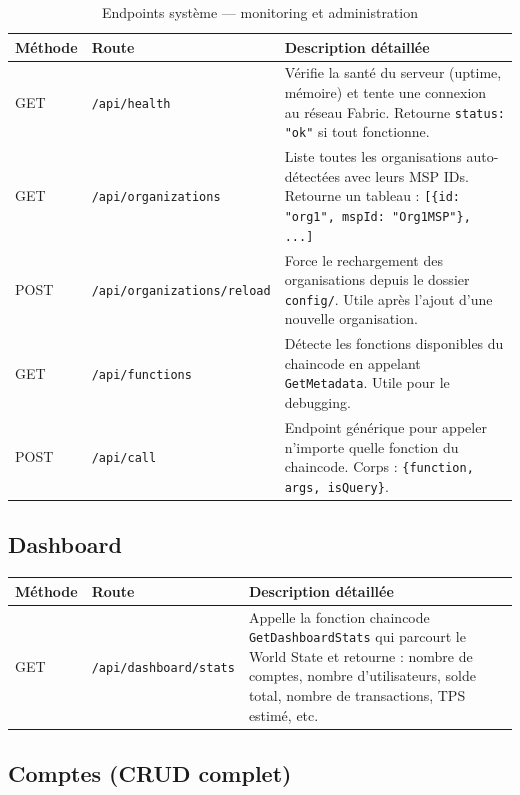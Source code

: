 \documentclass[12pt,a4paper,twoside]{report}
\begin{document}
\begin{table}[H]
\centering
\begin{tabularx}{\textwidth}{llX}
\toprule
\textbf{Méthode} & \textbf{Route} & \textbf{Description détaillée} \\
\midrule
GET & \texttt{/api/health} & Vérifie la santé du serveur (uptime, mémoire) et tente une connexion au réseau Fabric. Retourne \texttt{status: "ok"} si tout fonctionne. \\
GET & \texttt{/api/organizations} & Liste toutes les organisations auto-détectées avec leurs MSP IDs. Retourne un tableau : \texttt{[\{id: "org1", mspId: "Org1MSP"\}, ...]} \\
POST & \texttt{/api/organizations/reload} & Force le rechargement des organisations depuis le dossier \texttt{config/}. Utile après l'ajout d'une nouvelle organisation. \\
GET & \texttt{/api/functions} & Détecte les fonctions disponibles du chaincode en appelant \texttt{GetMetadata}. Utile pour le debugging. \\
POST & \texttt{/api/call} & Endpoint générique pour appeler n'importe quelle fonction du chaincode. Corps : \texttt{\{function, args, isQuery\}}. \\
\bottomrule
\end{tabularx}
\caption{Endpoints système --- monitoring et administration}
\end{table}

\subsection{Dashboard}

\begin{table}[H]
\centering
\begin{tabularx}{\textwidth}{llX}
\toprule
\textbf{Méthode} & \textbf{Route} & \textbf{Description détaillée} \\
\midrule
GET & \texttt{/api/dashboard/stats} & Appelle la fonction chaincode \texttt{GetDashboardStats} qui parcourt le World State et retourne : nombre de comptes, nombre d'utilisateurs, solde total, nombre de transactions, TPS estimé, etc. \\
\bottomrule
\end{tabularx}
\end{table}

\subsection{Comptes (CRUD complet)}
\end{document}
